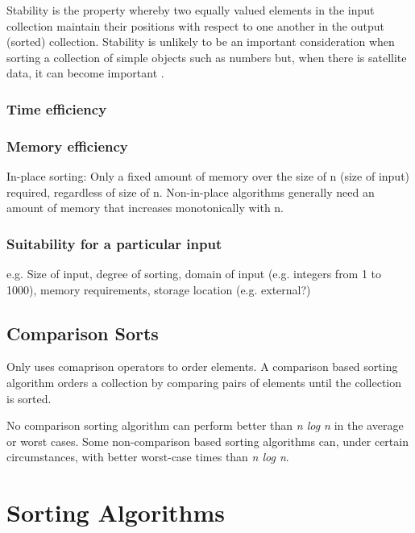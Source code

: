 \documentclass[12pt, a4paper]{article}
\begin{document}
Stability is the property whereby two equally valued elements in the input collection maintain their positions with respect to one another in the output (sorted) collection. Stability is unlikely to be an important consideration when sorting a collection of simple objects such as numbers but, when there is satellite data, it can become important \autocite{cormen01}.

\subsubsection{Time efficiency}

\subsubsection{Memory efficiency}
In-place sorting: Only a fixed amount of memory over the size of n (size of input) required, regardless of size of n. Non-in-place algorithms generally need an amount of memory that increases monotonically with n.

\subsubsection{Suitability for a particular input}

e.g. Size of input, degree of sorting, domain of input (e.g. integers from 1 to 1000), memory requirements, storage location (e.g. external?)

\subsection{Comparison Sorts}

Only uses comaprison operators to order elements. A comparison based sorting algorithm orders a collection by comparing pairs of elements until the collection is sorted.

No comparison sorting algorithm can perform better than \emph{n log n} in the average or worst cases. Some non-comparison based sorting algorithms can, under certain circumstances, with better worst-case times than \emph{n log n}.

\section{Sorting Algorithms}

\end{document}
